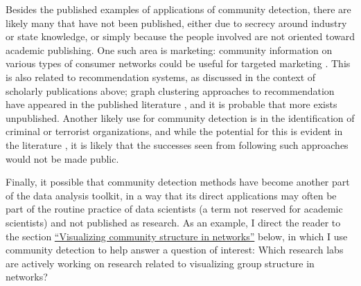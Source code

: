 Besides the published examples of applications of community detection,
there are likely many that have not been published, either due to
secrecy around industry or state knowledge, or simply because the people
involved are not oriented toward academic publishing. One such area is
marketing: community information on various types of consumer networks
could be useful for targeted marketing
\autocite{labatut_detection_2012}. This is also related to
recommendation systems, as discussed in the context of scholarly
publications above; graph clustering approaches to recommendation have
appeared in the published literature
\autocites{reddy_graph_2002}{fouss_random-walk_2007}, and it is probable
that more exists unpublished. Another likely use for community detection
is in the identification of criminal or terrorist organizations, and
while the potential for this is evident in the literature
\autocites{krebs_mapping_2002}{nath_crime_2006}{carlos_andre_community_2012}{clauset_developmental_2012}{waskiewicz_friend_2012}{ferrara_detecting_2014},
it is likely that the successes seen from following such approaches
would not be made public.

Finally, it possible that community detection methods have become
another part of the data analysis toolkit, in a way that its direct
applications may often be part of the routine practice of data
scientists (a term not reserved for academic scientists) and not
published as research. As an example, I direct the reader to the section
\protect\hyperlink{visualization}{``Visualizing community structure in
networks''} below, in which I use community detection to help answer a
question of interest: Which research labs are actively working on
research related to visualizing group structure in networks?
